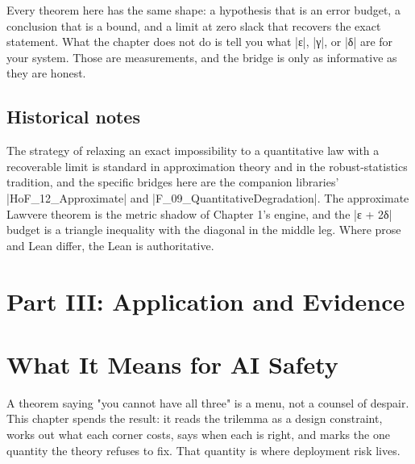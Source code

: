 \documentclass{memoir}
\begin{document}
Every theorem here has the same shape: a hypothesis that is an error budget, a
conclusion that is a bound, and a limit at zero slack that recovers the exact
statement. What the chapter does not do is tell you what \LeanVerb|ε|, \LeanVerb|γ|, or \LeanVerb|δ| are
for your system. Those are measurements, and the bridge is only as informative
as they are honest.



\section{Historical notes}\label{Two--Schemas--of--Impossibility-005F-005F-005F--Machine--Checked--Limits--of--Trustworthy--Machine--Learning-005F-005F-005F--and--Why--They--Tighten--with--Capability----Approximate--Bridges--to--Real--Models----Historical--notes}

The strategy of relaxing an exact impossibility to a quantitative law with a
recoverable limit is standard in approximation theory and in the
robust-statistics tradition, and the specific bridges here are the companion
libraries' \LeanVerb|HoF_12_Approximate| and \LeanVerb|F_09_QuantitativeDegradation|. The
approximate Lawvere theorem is the metric shadow of Chapter 1's engine, and the
\LeanVerb|ε + 2δ| budget is a triangle inequality with the diagonal in the middle leg.
Where prose and Lean differ, the Lean is authoritative.





\chapter{Part III: Application and Evidence}\label{Two--Schemas--of--Impossibility-005F-005F-005F--Machine--Checked--Limits--of--Trustworthy--Machine--Learning-005F-005F-005F--and--Why--They--Tighten--with--Capability----Part--III-005F-005F-005F--Application--and--Evidence}




\chapter{What It Means for AI Safety}\label{Two--Schemas--of--Impossibility-005F-005F-005F--Machine--Checked--Limits--of--Trustworthy--Machine--Learning-005F-005F-005F--and--Why--They--Tighten--with--Capability----What--It--Means--for--AI--Safety}

A theorem saying "you cannot have all three" is a menu, not a counsel of
despair. This chapter spends the result: it reads the trilemma as a design
constraint, works out what each corner costs, says when each is right, and marks
the one quantity the theory refuses to fix. That quantity is where deployment
risk lives.
\end{document}

